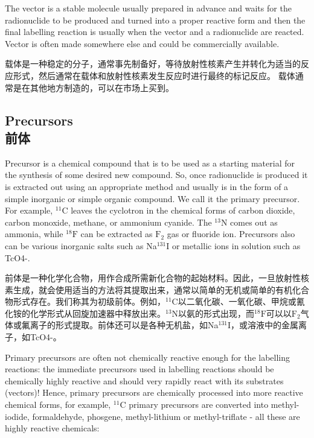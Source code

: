 \documentclass[dvipsnames, svgnames,a4paper,11pt]{article}
\begin{document}
The vector is a stable molecule usually prepared in advance and waits for the
radionuclide to be produced and turned into a proper reactive form and then the final
labelling reaction is usually when the vector and a radionuclide are reacted. Vector is
often made somewhere else and could be commercially available.

载体是一种稳定的分子，通常事先制备好，等待放射性核素产生并转化为适当的反应形式，然后通常在载体和放射性核素发生反应时进行最终的标记反应。 载体通常是在其他地方制造的，可以在市场上买到。

\subsection{Precursors\\前体}

Precursor is a chemical compound that is to be used as a starting material for the
synthesis of some desired new compound. So, once radionuclide is produced it is
extracted out using an appropriate method and usually is in the form of a simple
inorganic or simple organic compound. We call it the primary precursor. For example,
${}^{11}\mathrm{C}$ leaves the cyclotron in the chemical forms of carbon dioxide, carbon monoxide,
methane, or ammonium cyanide. The ${}^{13}\mathrm{N}$ comes out as ammonia, while ${}^{18}\mathrm{F}$ can be
extracted as $\mathrm{F}_2$ gas or fluoride ion. Precursors also can be various inorganic salts
such as Na${}^{131}\mathrm{I}$ or metallic ions in solution such as TcO4-.

前体是一种化学化合物，用作合成所需新化合物的起始材料。因此，一旦放射性核素生成，就会使用适当的方法将其提取出来，通常以简单的无机或简单的有机化合物形式存在。我们称其为初级前体。例如，${}^{11}\mathrm{C}$以二氧化碳、一氧化碳、甲烷或氰化铵的化学形式从回旋加速器中释放出来。${}^{13}\mathrm{N}$以氨的形式出现，而${}^{18}\mathrm{F}$可以以$\mathrm{F}_2$气体或氟离子的形式提取。前体还可以是各种无机盐，如Na${}^{131}\mathrm{I}$，或溶液中的金属离子，如TcO4-。

Primary precursors are often not chemically reactive enough for the labelling
reactions: the immediate precursors used in labelling reactions should be chemically
highly reactive and should very rapidly react with its substrates (vectors)! Hence,
primary precursors are chemically processed into more reactive chemical forms, for
example, ${}^{11}\mathrm{C}$ primary precursors are converted into methyl-iodide, formaldehyde,
phosgene, methyl-lithium or methyl-triflate - all these are highly reactive chemicals:
\end{document}

